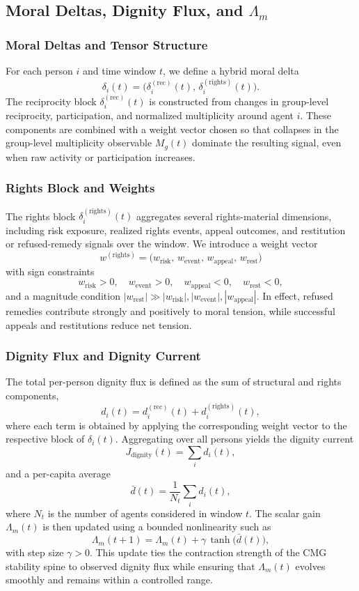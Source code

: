 \documentclass[11pt]{article}
\begin{document}
\subsection{Moral Deltas, Dignity Flux, and \texorpdfstring{$\Lambda_m$}{Lambda\_m}}

\subsubsection{Moral Deltas and Tensor Structure}

For each person \(i\) and time window \(t\), we define a hybrid moral delta
\[
\delta_i(t) = \bigl(\delta_i^{(\mathrm{rec})}(t),\, \delta_i^{(\mathrm{rights})}(t)\bigr).
\]
The reciprocity block \(\delta_i^{(\mathrm{rec})}(t)\) is constructed from changes in group-level reciprocity, participation, and normalized multiplicity around agent \(i\). These components are combined with a weight vector chosen so that collapses in the group-level multiplicity observable \(M_g(t)\) dominate the resulting signal, even when raw activity or participation increases.

\subsubsection{Rights Block and Weights}

The rights block \(\delta_i^{(\mathrm{rights})}(t)\) aggregates several rights-material dimensions, including risk exposure, realized rights events, appeal outcomes, and restitution or refused-remedy signals over the window. We introduce a weight vector
\[
w^{(\mathrm{rights})} = \bigl(w_{\mathrm{risk}},\, w_{\mathrm{event}},\, w_{\mathrm{appeal}},\, w_{\mathrm{rest}}\bigr)
\]
with sign constraints
\[
w_{\mathrm{risk}} > 0,\quad
w_{\mathrm{event}} > 0,\quad
w_{\mathrm{appeal}} < 0,\quad
w_{\mathrm{rest}} < 0,
\]
and a magnitude condition \(|w_{\mathrm{rest}}| \gg |w_{\mathrm{risk}}|, |w_{\mathrm{event}}|, |w_{\mathrm{appeal}}|\). In effect, refused remedies contribute strongly and positively to moral tension, while successful appeals and restitutions reduce net tension.

\subsubsection{Dignity Flux and Dignity Current}

The total per-person dignity flux is defined as the sum of structural and rights components,
\[
d_i(t) = d_i^{(\mathrm{rec})}(t) + d_i^{(\mathrm{rights})}(t),
\]
where each term is obtained by applying the corresponding weight vector to the respective block of \(\delta_i(t)\). Aggregating over all persons yields the dignity current
\[
J_{\mathrm{dignity}}(t) = \sum_i d_i(t),
\]
and a per-capita average
\[
\bar{d}(t) = \frac{1}{N_t} \sum_i d_i(t),
\]
where \(N_t\) is the number of agents considered in window \(t\). The scalar gain \(\Lambda_m(t)\) is then updated using a bounded nonlinearity such as
\[
\Lambda_m(t+1) = \Lambda_m(t) + \gamma\, \tanh\!\bigl(\bar{d}(t)\bigr),
\]
with step size \(\gamma > 0\). This update ties the contraction strength of the CMG stability spine to observed dignity flux while ensuring that \(\Lambda_m(t)\) evolves smoothly and remains within a controlled range.
\end{document}
